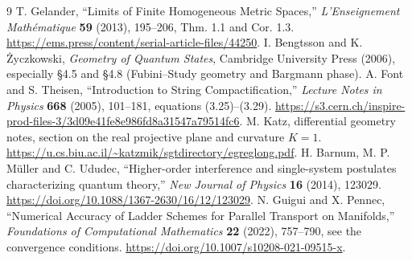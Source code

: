 \documentclass[11pt,a4paper]{article}
\begin{document}
\begin{thebibliography}{9}\small
{} T. Gelander, ``Limits of Finite Homogeneous Metric Spaces,'' \emph{L'Enseignement Math\'ematique} \textbf{59} (2013), 195--206, Thm. 1.1 and Cor. 1.3. \url{https://ems.press/content/serial-article-files/44250}.
 I. Bengtsson and K. \.{Z}yczkowski, \emph{Geometry of Quantum States}, Cambridge University Press (2006), especially \S4.5 and \S4.8 (Fubini--Study geometry and Bargmann phase).
 A. Font and S. Theisen, ``Introduction to String Compactification,'' \emph{Lecture Notes in Physics} \textbf{668} (2005), 101--181, equations (3.25)--(3.29). \url{https://s3.cern.ch/inspire-prod-files-3/3d09e41fe8e986fd8a31547a79514fc6}.
 M. Katz, differential geometry notes, section on the real projective plane and curvature \(K=1\). \url{https://u.cs.biu.ac.il/~katzmik/sgtdirectory/egreglong.pdf}.
 H. Barnum, M. P. M\"uller and C. Ududec, ``Higher-order interference and single-system postulates characterizing quantum theory,'' \emph{New Journal of Physics} \textbf{16} (2014), 123029. \url{https://doi.org/10.1088/1367-2630/16/12/123029}.
 N. Guigui and X. Pennec, ``Numerical Accuracy of Ladder Schemes for Parallel Transport on Manifolds,'' \emph{Foundations of Computational Mathematics} \textbf{22} (2022), 757--790, see the convergence conditions. \url{https://doi.org/10.1007/s10208-021-09515-x}.
\end{thebibliography}
\end{document}
